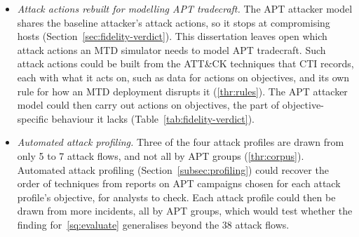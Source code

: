 \documentclass{cshonours}
\begin{document}
\begin{itemize}
  \item \emph{Attack actions rebuilt for modelling APT tradecraft.} The APT
  attacker model shares the baseline attacker's attack actions, so it stops at
  compromising hosts (Section~\ref{sec:fidelity-verdict}). This dissertation
  leaves open which attack actions an MTD simulator needs to model APT
  tradecraft. Such attack actions could be built from the ATT\&CK techniques that CTI records, each with
  what it acts on, such as data for actions on objectives, and its own rule for
  how an MTD deployment disrupts it (\ref{thr:rules}). The APT attacker model
  could then carry out actions on objectives, the part of objective-specific
  behaviour it lacks (Table~\ref{tab:fidelity-verdict}).
  \item \emph{Automated attack profiling.} Three of the four attack profiles
  are drawn from only 5 to 7 attack flows, and not all by APT groups
  (\ref{thr:corpus}). Automated attack profiling
  (Section~\ref{subsec:profiling}) could recover the order of techniques from
  reports on APT campaigns chosen for each attack profile's objective, for
  analysts to check. Each attack profile could then be drawn from more
  incidents, all by APT groups, which would test whether the finding
  for~\ref{sq:evaluate} generalises beyond the 38 attack flows.

\end{itemize}
\end{document}
